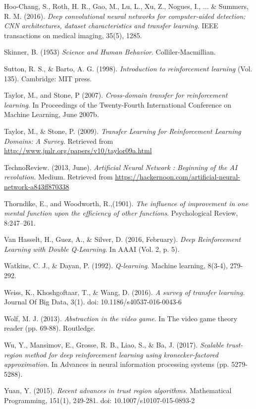 \begin{thebibliography}{99}
\bibitem{} Hoo-Chang, S., Roth, H. R., Gao, M., Lu, L., Xu, Z., Nogues, I., ... \& Summers, R. M. (2016).\textit{ Deep convolutional neural networks for computer-aided detection: CNN architectures, dataset characteristics and transfer learning}. IEEE transactions on medical imaging, 35(5), 1285.

\bibitem{} Skinner, B. (1953) \textit{Science and Human Behavior}. Colliler-Macmillian.

\bibitem{} Sutton, R. S., \& Barto, A. G. (1998).\textit{ Introduction to reinforcement learning} (Vol. 135).
Cambridge: MIT press.

\bibitem{} Taylor, M., and Stone, P (2007). \textit{Cross-domain transfer for reinforcement learning}. In Proceedings of the Twenty-Fourth International Conference on Machine Learning, June 2007b.

\bibitem{} Taylor, M., \& Stone, P. (2009).\textit{ Transfer Learning for Reinforcement Learning Domains: A Survey}. Retrieved from \url{http://www.jmlr.org/papers/v10/taylor09a.html}

\bibitem{} TechnoReview. (2013, June).\textit{ Artificial Neural Network : Beginning of the AI revolution.}
Medium. Retrieved from \url{https://hackernoon.com/artificial-neural-network-a843ff870338}

\bibitem{} Thorndike, E., and Woodworth, R.,(1901). \textit{The influence of improvement in one mental function upon the efficiency of other functions}. Psychological Review, 8:247–261.

\bibitem{} Van Hasselt, H., Guez, A., \& Silver, D. (2016, February). \textit{Deep Reinforcement Learning with
Double Q-Learning}. In AAAI (Vol. 2, p. 5).

\bibitem{} Watkins, C. J., \& Dayan, P. (1992).\textit{ Q-learning}. Machine learning, 8(3-4), 279-292.

\bibitem{} Weiss, K., Khoshgoftaar, T., \& Wang, D. (2016). \textit{A survey of transfer learning.} Journal Of Big Data, 3(1). doi: 10.1186/s40537-016-0043-6

\bibitem{} Wolf, M. J. (2013). \textit{Abstraction in the video game}. In The video game theory reader (pp. 69-88). Routledge.

\bibitem{} Wu, Y., Mansimov, E., Grosse, R. B., Liao, S., \& Ba, J. (2017).\textit{ Scalable trust-region method for deep reinforcement learning using kronecker-factored approximation}. In Advances in neural information processing systems (pp. 5279-5288).

\bibitem{} Yuan, Y. (2015). \textit{Recent advances in trust region algorithms}. Mathematical Programming, 151(1), 249-281. doi: 10.1007/s10107-015-0893-2

\end{thebibliography}

